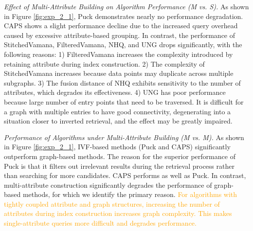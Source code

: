 \documentclass[sigconf, nonacm]{acmart}
\begin{document}
{\begin{figure}[t]
	\end{figure}
	
	\textit{Effect of Multi-Attribute Building on Algorithm Performance (M vs. S).}
	As shown in Figure \ref{fig:exp_2_1}, Puck demonstrates nearly no performance degradation. CAPS shows a slight performance decline due to the increased query overhead caused by excessive attribute-based grouping. In contrast, the performance of StitchedVamana, FilteredVamana, NHQ, and UNG drops significantly, with the following reasons: 1) FilteredVamana increases the complexity introduced by retaining attribute during index construction. 2) The complexity of StitchedVamana increases because data points may duplicate across multiple subgraphs. 3) The fusion distance of NHQ exhibits sensitivity to the number of attributes, which degrades its effectiveness. 4) UNG has poor performance because large number of entry points that need to be traversed. It is difficult for a graph with multiple entries to have good connectivity, degenerating into a situation closer to inverted retrieval, and the effect may be greatly impaired.
	
	
	
	\textit{Performance of Algorithms under Multi-Attribute Building (M vs. M).}  
	As shown in Figure \ref{fig:exp_2_1}, IVF-based methods (Puck and CAPS) significantly outperform graph-based methods. The reason for the superior performance of Puck is that it filters out irrelevant results during the retrieval process rather than searching for more candidates. CAPS performs as well as Puck. In contrast, multi-attribute construction significantly degrades the performance of graph-based methods, for which we identify the primary reason. 
	\textcolor{orange}{For algorithms with tightly coupled attribute and graph structures, increasing the number of attributes during index construction increases graph complexity. This makes single-attribute queries more difficult and degrades performance.}
	
}
\end{document}

